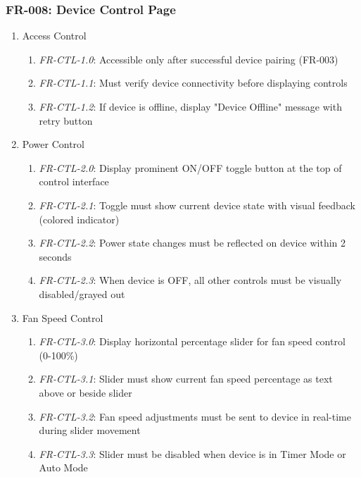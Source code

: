 \documentclass[conference]{IEEEtran}
\begin{document}
            \subsubsection{FR-008: Device Control Page}
                \begin{enumerate}
                    \item Access Control
                        \begin{enumerate}
                            \item \textit{FR-CTL-1.0}: Accessible only after successful device pairing (FR-003)
                            \item \textit{FR-CTL-1.1}: Must verify device connectivity before displaying controls
                            \item \textit{FR-CTL-1.2}: If device is offline, display "Device Offline" message with retry button
                        \end{enumerate}
                    \item Power Control
                        \begin{enumerate}
                            \item \textit{FR-CTL-2.0}: Display prominent ON/OFF toggle button at the top of control interface
                            \item \textit{FR-CTL-2.1}: Toggle must show current device state with visual feedback (colored indicator)
                            \item \textit{FR-CTL-2.2}: Power state changes must be reflected on device within 2 seconds
                            \item \textit{FR-CTL-2.3}: When device is OFF, all other controls must be visually disabled/grayed out
                        \end{enumerate}
                    \item Fan Speed Control
                        \begin{enumerate}
                            \item \textit{FR-CTL-3.0}: Display horizontal percentage slider for fan speed control (0-100\%)
                            \item \textit{FR-CTL-3.1}: Slider must show current fan speed percentage as text above or beside slider
                            \item \textit{FR-CTL-3.2}: Fan speed adjustments must be sent to device in real-time during slider movement
                            \item \textit{FR-CTL-3.3}: Slider must be disabled when device is in Timer Mode or Auto Mode

\end{enumerate}
\end{enumerate}
\end{document}

